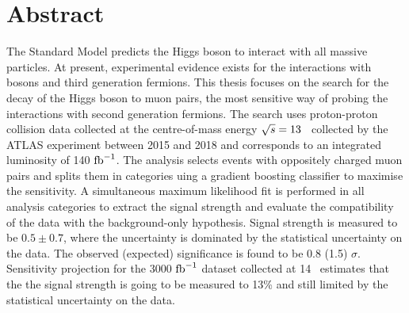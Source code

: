 \chapter*{Abstract}

The Standard Model predicts the Higgs boson to interact
with all massive particles. At present, experimental
evidence exists for the interactions with bosons and 
third generation fermions. This thesis focuses on the
search for the decay of the Higgs boson to muon pairs,
the most sensitive way of probing the interactions with
second generation fermions. The search uses proton-proton
collision data collected at the centre-of-mass energy
$\sqrt{s} = 13$ \TeV~collected by the ATLAS experiment
between 2015 and 2018 and corresponds to an integrated
luminosity of 140 $\text{fb}^{-1}$. The analysis selects events
with oppositely charged muon pairs and splits them in
categories uing a gradient boosting classifier to maximise
the sensitivity. A simultaneous maximum likelihood fit
is performed in all analysis categories to extract the
signal strength and evaluate the compatibility of the
data with the background-only hypothesis. Signal strength
is measured to be $0.5 \pm 0.7$, where the uncertainty is
dominated by the statistical uncertainty on the data.
The observed (expected) significance is found to be
0.8 (1.5) $\sigma$. Sensitivity projection for the 3000
$\text{fb}^{-1}$ dataset collected at 14 \TeV~estimates that the 
the signal strength is going to be measured to 13\% 
and still limited by the statistical uncertainty on the
data.


\thispagestyle{empty}
